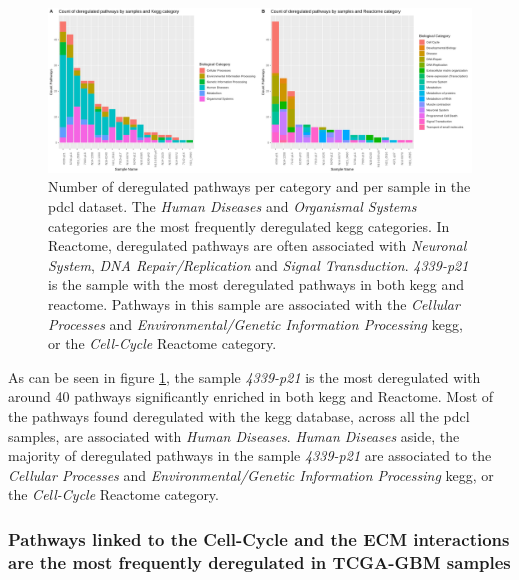 \begin{figure}
    \includegraphics[width=\textwidth]{img/barplot-categ-pdcl}
    \caption{
        Number of deregulated pathways per category and per sample in the \acrshort{pdcl} dataset.
        The  \textit{Human Diseases} and \textit{Organismal Systems} categories are the most frequently deregulated \acrshort{kegg} categories.
        In Reactome, deregulated pathways are often associated with \textit{Neuronal System}, \textit{DNA Repair/Replication} and \textit{Signal Transduction}.
        \textit{4339-p21} is the sample with the most deregulated pathways in both \acrshort{kegg} and reactome.
        Pathways in this sample are associated with the \textit{Cellular Processes} and \textit{Environmental/Genetic Information Processing} \acrshort{kegg}, or the \textit{Cell-Cycle} Reactome category.
    }
    \label{fig:barplot-categ-pdcl}
\end{figure}

As can be seen in figure \ref*{fig:barplot-categ-pdcl}, the sample \textit{4339-p21} is the most deregulated with around 40 pathways significantly enriched in both \acrshort{kegg} and Reactome.
Most of the pathways found deregulated with the \acrshort{kegg} database, across all the \acrshort{pdcl} samples, are associated with \textit{Human Diseases}.
\textit{Human Diseases} aside, the majority of deregulated pathways in the sample \textit{4339-p21} are associated to the \textit{Cellular Processes} and \textit{Environmental/Genetic Information Processing} \acrshort{kegg}, or the \textit{Cell-Cycle} Reactome category.

\subsubsection{Pathways linked to the Cell-Cycle and the ECM interactions are the most frequently deregulated in TCGA-GBM samples}

